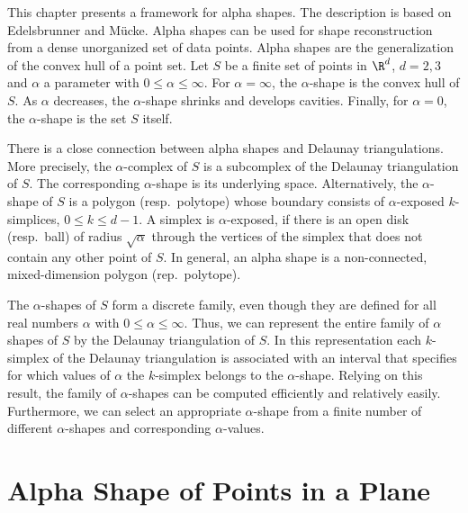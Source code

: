 This chapter presents a framework for alpha shapes. The description is
based on Edelsbrunner and M\"ucke.  Alpha shapes can be used for shape
reconstruction from a dense unorganized set of data points.  Alpha
shapes are the generalization of the convex hull of a point set. Let
$S$ be a finite set of points in $\R^d$, $d = 2,3$ and $\alpha$ a
parameter with $0 \leq \alpha \leq \infty$. For $\alpha =
\infty$, the $\alpha$-shape is the convex hull of $S$.  As $\alpha$
decreases, the $\alpha$-shape shrinks and develops cavities. Finally,
for $\alpha = 0$, the $\alpha$-shape is the set $S$ itself.

There is a close connection between alpha shapes and Delaunay
triangulations. More precisely, the $\alpha$-complex of $S$ is a
subcomplex of the Delaunay triangulation of $S$.  The corresponding
$\alpha$-shape is its underlying space.  Alternatively, the
$\alpha$-shape of $S$ is a polygon (resp.\ polytope) whose boundary
consists of $\alpha$-exposed $k$-simplices, $0 \leq k \leq d-1$. A
simplex is $\alpha$-exposed, if there is an open disk (resp.\ ball) of
radius $\sqrt{\alpha}$ through the vertices of the simplex that does
not contain any other point of $S$. In general, an alpha shape is a
non-connected, mixed-dimension polygon (rep.\ polytope).

The $\alpha$-shapes of $S$ form a discrete family, even though they
are defined for all real numbers $\alpha$ with $0 \leq \alpha
\leq \infty$. Thus, we can represent the entire family of $\alpha$ shapes
of $S$ by the Delaunay triangulation of $S$. In this representation
each $k$-simplex of the Delaunay triangulation is associated with an
interval that specifies for which values of $\alpha$ the $k$-simplex
belongs to the $\alpha$-shape. Relying on this result, the family of
$\alpha$-shapes can be computed efficiently and relatively
easily. Furthermore, we can select an appropriate $\alpha$-shape from a
finite number of different $\alpha$-shapes and corresponding
$\alpha$-values.


\section{Alpha Shape of Points in a Plane \label{I1_SectAlpha Shape_2}}

